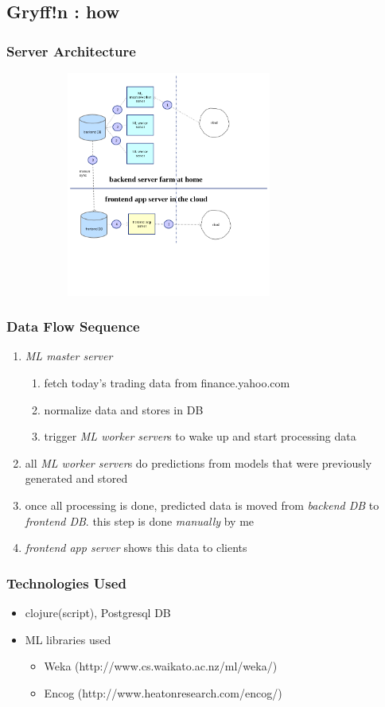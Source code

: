 \documentclass{beamer}
\begin{document}
\subsection{Gryff!n : how}
\begin{frame}
  \frametitle{Server Architecture}
  \includegraphics[height=7.4cm,width=10.8cm]{stox_architecture.png}
\end{frame}
\begin{frame}
  \frametitle{Data Flow Sequence}
  \begin{enumerate}
  \item \textit{ML master server}
    \begin{enumerate}
    \item fetch today's trading data from finance.yahoo.com
    \item normalize data and stores in DB
    \item trigger \textit{ML worker server}s to wake up and start processing data
    \end{enumerate}
  \item all \textit{ML worker server}s do predictions from models that were previously generated and stored
  \item once all processing is done, predicted data is moved from \textit{backend DB} to \textit{frontend DB}. this step is done \textit{manually} by me
  \item \textit{frontend app server} shows this data to clients
  \end{enumerate}
\end{frame}
\begin{frame}
  \frametitle{Technologies Used}
  \begin{itemize}
  \item clojure(script), Postgresql DB
  \item ML libraries used
    \begin{itemize}
    \item Weka (http://www.cs.waikato.ac.nz/ml/weka/)
    \item Encog (http://www.heatonresearch.com/encog/)
    \end{itemize}
  \end{itemize}
\end{frame}
\end{document}
